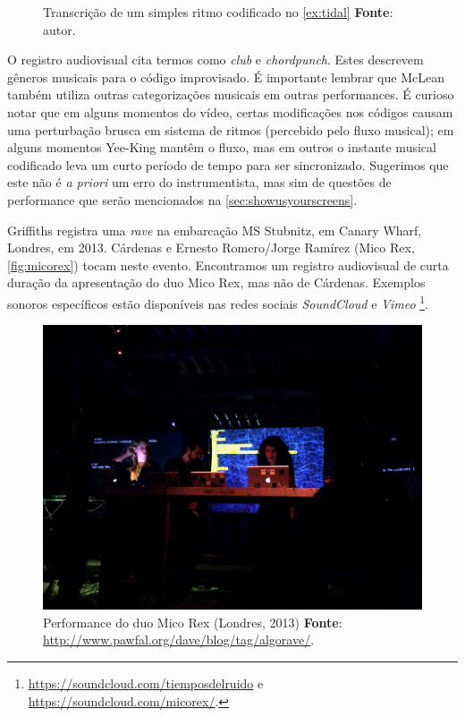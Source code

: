\begin{figure}[!h]
  \centering
  
  \caption{Transcrição de um simples ritmo codificado no \autoref{ex:tidal} \textbf{Fonte}: autor.}
  \label{fig:canute2}
\end{figure}


O registro audiovisual cita termos como \emph{club} e \emph{chordpunch}. Estes descrevem gêneros musicais para o código improvisado. É importante lembrar que McLean também utiliza outras categorizações musicais em outras performances. É curioso notar que em alguns momentos do vídeo, certas modificações nos códigos causam uma perturbação brusca em sistema de ritmos (percebido pelo fluxo musical); em alguns momentos Yee-King mantêm o fluxo, mas em outros o instante musical codificado leva um curto período de tempo para ser sincronizado. Sugerimos que este não é  \emph{a priori} um erro do instrumentista, mas sim de questões de performance que serão mencionados na \autoref{sec:showusyourscreens}.

Griffiths registra uma \emph{rave} na embarcação  MS Stubnitz, em Canary Wharf, Londres, em 2013. Cárdenas e Ernesto Romero/Jorge Ramírez (Mico Rex, \autoref{fig:micorex}) tocam neste evento. Encontramos um registro audiovisual de curta duração da apresentação do duo Mico Rex, mas não de Cárdenas. Exemplos sonoros específicos estão disponíveis nas redes sociais \emph{SoundCloud} e \emph{Vimeo} \footnote{\url{https://soundcloud.com/tiemposdelruido} e \url{https://soundcloud.com/micorex/}.}.

\begin{figure}[!h]
  \centering
  \includegraphics[scale=0.31]{imagens/cardenas.jpg}
  \caption{Performance do duo Mico Rex (Londres, 2013) \textbf{Fonte}: \url{http://www.pawfal.org/dave/blog/tag/algorave/}.}
  \label{fig:cardenas}
\end{figure}

